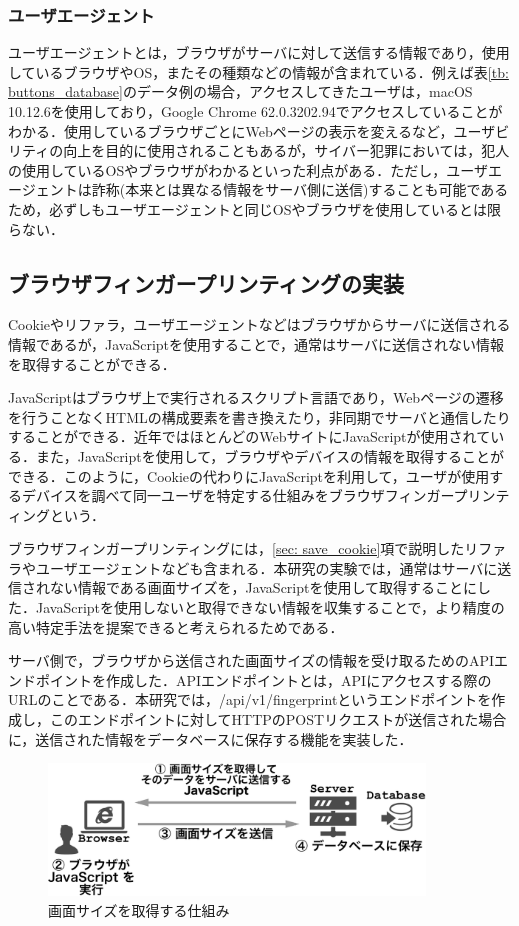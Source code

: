 \documentclass[10pt, a4paper]{jreport}
\begin{document}
\subsubsection*{ユーザエージェント}
ユーザエージェントとは，ブラウザがサーバに対して送信する情報であり，使用しているブラウザやOS，またその種類などの情報が含まれている．例えば表\ref{tb: buttons_database}のデータ例の場合，アクセスしてきたユーザは，macOS 10.12.6を使用しており，Google Chrome 62.0.3202.94でアクセスしていることがわかる．使用しているブラウザごとにWebページの表示を変えるなど，ユーザビリティの向上を目的に使用されることもあるが，サイバー犯罪においては，犯人の使用しているOSやブラウザがわかるといった利点がある．ただし，ユーザエージェントは詐称(本来とは異なる情報をサーバ側に送信)することも可能であるため，必ずしもユーザエージェントと同じOSやブラウザを使用しているとは限らない．

\subsection{ブラウザフィンガープリンティングの実装}
Cookieやリファラ，ユーザエージェントなどはブラウザからサーバに送信される情報であるが，JavaScriptを使用することで，通常はサーバに送信されない情報を取得することができる．

JavaScriptはブラウザ上で実行されるスクリプト言語であり，Webページの遷移を行うことなくHTMLの構成要素を書き換えたり，非同期でサーバと通信したりすることができる．近年ではほとんどのWebサイトにJavaScriptが使用されている．また，JavaScriptを使用して，ブラウザやデバイスの情報を取得することができる．このように，Cookieの代わりにJavaScriptを利用して，ユーザが使用するデバイスを調べて同一ユーザを特定する仕組みをブラウザフィンガープリンティングという．

ブラウザフィンガープリンティングには，\ref{sec: save_cookie}項で説明したリファラやユーザエージェントなども含まれる．本研究の実験では，通常はサーバに送信されない情報である画面サイズを，JavaScriptを使用して取得することにした．JavaScriptを使用しないと取得できない情報を収集することで，より精度の高い特定手法を提案できると考えられるためである．

サーバ側で，ブラウザから送信された画面サイズの情報を受け取るためのAPIエンドポイントを作成した．APIエンドポイントとは，APIにアクセスする際のURLのことである．本研究では，/api/v1/fingerprintというエンドポイントを作成し，このエンドポイントに対してHTTPのPOSTリクエストが送信された場合に，送信された情報をデータベースに保存する機能を実装した．

\begin{figure}[H]
	\begin{center}
		\includegraphics[width=100mm]{figures/fingerprint.pdf}
	\end{center}
	\caption{画面サイズを取得する仕組み}
	\label{fig: fingerprint}
\end{figure}
\end{document}
